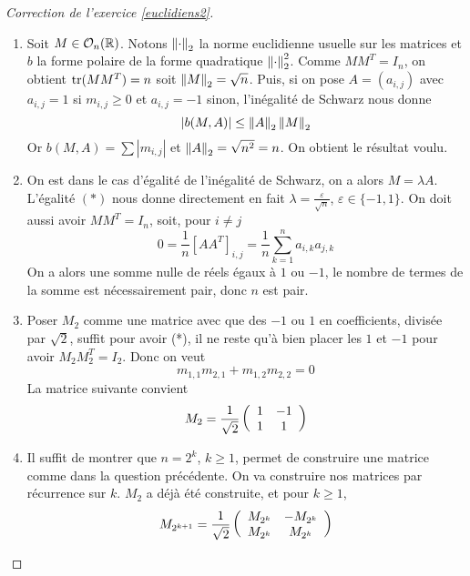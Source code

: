 \begin{proof}[Correction de l'exercice \ref{euclidiens2}]
	\begin{enumerate}
		\item Soit $M\in\mathcal O_n(\operatorname{\mathbb R})$. 
		Notons $\left\lVert \cdot\right\rVert_2$ la norme euclidienne usuelle sur les matrices et $b$ la forme polaire de la forme quadratique $\left\lVert \cdot\right\rVert_2^2$. 
		Comme $MM^T=I_n$, on obtient $\operatorname{tr}(MM^T)=n$ soit $\left\lVert M\right\rVert_2=\sqrt n$. 
		Puis, si on pose $A=(a_{i,j})$ avec $a_{i,j}=1$ si $m_{i,j}\geq 0$ et $a_{i,j}=-1$ sinon, l'inégalité de Schwarz nous donne
		\[
			|b(M,A)|\leq\left\lVert A\right\rVert_2\left\lVert M\right\rVert_2
		\]
		Or $b(M,A)=\sum|m_{i,j}|$ et $\left\lVert A\right\rVert_2=\sqrt{n^2}=n$. 
		On obtient le résultat voulu.

		\item On est dans le cas d'égalité de l'inégalité de Schwarz, on a alors $M=\lambda A$.
		L'égalité $(*)$ nous donne directement en fait $\lambda=\frac\varepsilon{\sqrt n}$, $\varepsilon\in\lbrace -1,1\rbrace$. 
		On doit aussi avoir $MM^T=I_n$, soit, pour $i\neq j$
		\[
			0=\frac1n[AA^T]_{i,j}=\frac1n\sum_{k=1}^na_{i,k}a_{j,k}
		\]
		On a alors une somme nulle de réels égaux à $1$ ou $-1$, le nombre de termes de la somme est nécessairement pair, donc $n$ est pair.

		\item Poser $M_2$ comme une matrice avec que des $-1$ ou $1$ en coefficients, divisée par $\sqrt2$, suffit pour avoir (*),
		il ne reste qu'à bien placer les $1$ et $-1$ pour avoir $M_2M_2^T=I_2$. 
		Donc on veut
		\[
			m_{1,1}m_{2,1}+m_{1,2}m_{2,2}=0
		\]
		La matrice suivante convient 
		\[
			M_2=\frac1{\sqrt2}\left(\begin{array}{c c} 1 & -1\\ 1 & 1\end{array}\right)
		\]
		
		\item Il suffit de montrer que $n=2^k$, $k\geq 1$, permet de construire une matrice comme dans la question précédente.
		On va construire nos matrices par récurrence sur $k$. 
		$M_2$ a déjà été construite, et pour $k\geq 1$, 
		\[
			M_{2^{k+1}}=\frac1{\sqrt2}\left(\begin{array}{c c} M_{2^k} & -M_{2^k}\\ M_{2^k} & M_{2^k}\end{array}\right)
		\]
		

\end{enumerate}
\end{proof}
